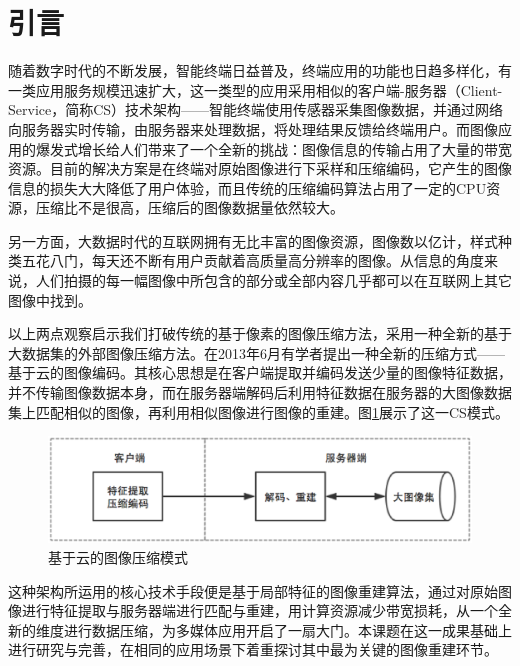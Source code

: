 \documentclass[UTF8]{csoarticle}
\begin{document}
\maketitle



\section{引言}

随着数字时代的不断发展，智能终端日益普及，终端应用的功能也日趋多样化，有一类应用服务规模迅速扩大，这一类型的应用采用相似的客户端-服务器（Client-Service，简称CS）技术架构——智能终端使用传感器采集图像数据，并通过网络向服务器实时传输，由服务器来处理数据，将处理结果反馈给终端用户。而图像应用的爆发式增长给人们带来了一个全新的挑战：图像信息的传输占用了大量的带宽资源。目前的解决方案是在终端对原始图像进行下采样和压缩编码，它产生的图像信息的损失大大降低了用户体验，而且传统的压缩编码算法占用了一定的CPU资源，压缩比不是很高，压缩后的图像数据量依然较大。

另一方面，大数据时代的互联网拥有无比丰富的图像资源，图像数以亿计，样式种类五花八门，每天还不断有用户贡献着高质量高分辨率的图像。从信息的角度来说，人们拍摄的每一幅图像中所包含的部分或全部内容几乎都可以在互联网上其它图像中找到。

以上两点观察启示我们打破传统的基于像素的图像压缩方法，采用一种全新的基于大数据集的外部图像压缩方法。在2013年6月有学者提出一种全新的压缩方式——基于云的图像编码。其核心思想是在客户端提取并编码发送少量的图像特征数据，并不传输图像数据本身，而在服务器端解码后利用特征数据在服务器的大图像数据集上匹配相似的图像，再利用相似图像进行图像的重建。图\ref{fig:overview}展示了这一CS模式。
\begin{figure}
\centering\includegraphics[width=12cm]{overview}
\caption{基于云的图像压缩模式}
\label{fig:overview}
\end{figure}
这种架构所运用的核心技术手段便是基于局部特征的图像重建算法，通过对原始图像进行特征提取与服务器端进行匹配与重建，用计算资源减少带宽损耗，从一个全新的维度进行数据压缩，为多媒体应用开启了一扇大门。本课题在这一成果基础上进行研究与完善，在相同的应用场景下着重探讨其中最为关键的图像重建环节。
\end{document}
